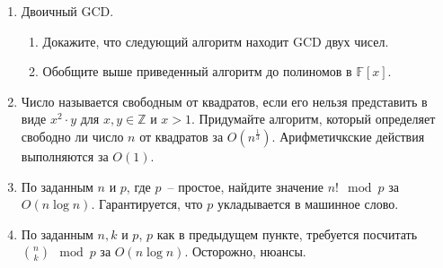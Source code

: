\begin{enumerate}

  \item Двоичный GCD.
  \begin{enumerate}
    \item Докажите, что следующий алгоритм находит GCD двух чисел.
      
    \item Обобщите выше приведенный алгоритм до полиномов в $\mathbb{F}[x]$.
  \end{enumerate}

  \item Число называется свободным от квадратов, если его нельзя представить 
  в виде $x^2 \cdot y$ для $x, y \in \mathbb{Z}$ и $x > 1$. Придумайте алгоритм,
  который определяет свободно ли число $n$ от квадратов за $O(n^{\frac{1}{3}})$.
  Арифметичкские действия выполняются за $O(1)$.

  \item По заданным $n$ и $p$, где $p$~-- простое, найдите значение 
    $n! \mod p$ за $O(n \log n)$. Гарантируется, что $p$ укладывается в 
    машинное слово.

  \item По заданным $n, k$ и $p$, $p$ как в предыдущем пункте, требуется 
    посчитать $\binom{n}{k} \mod p$ за $O(n \log n)$. Осторожно, нюансы.


\end{enumerate}



\clearpage
